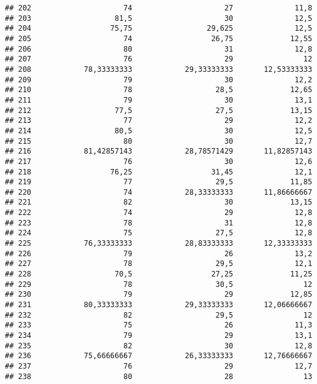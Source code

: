 \documentclass[
]{article}
\begin{document}
\begin{verbatim}
## 202                     74                     27              11,8
## 203                   81,5                     30              12,5
## 204                  75,75                 29,625              12,5
## 205                     74                  26,75             12,55
## 206                     80                     31              12,8
## 207                     76                     29                12
## 208            78,33333333            29,33333333       12,53333333
## 209                     79                     30              12,2
## 210                     78                   28,5             12,65
## 211                     79                     30              13,1
## 212                   77,5                   27,5             13,15
## 213                     77                     29              12,2
## 214                   80,5                     30              12,5
## 215                     80                     30              12,7
## 216            81,42857143            28,78571429       11,82857143
## 217                     76                     30              12,6
## 218                  76,25                  31,45              12,1
## 219                     77                   29,5             11,85
## 220                     74            28,33333333       11,86666667
## 221                     82                     30             13,15
## 222                     74                     29              12,8
## 223                     78                     31              12,8
## 224                     75                   27,5              12,8
## 225            76,33333333            28,83333333       12,33333333
## 226                     79                     26              13,2
## 227                     78                   29,5              12,1
## 228                   70,5                  27,25             11,25
## 229                     78                   30,5                12
## 230                     79                     29             12,85
## 231            80,33333333            29,33333333       12,06666667
## 232                     82                   29,5                12
## 233                     75                     26              11,3
## 234                     79                     29              13,1
## 235                     82                     30              12,8
## 236            75,66666667            26,33333333       12,76666667
## 237                     76                     29              12,7
## 238                     80                     28                13

\end{verbatim}
\end{document}

